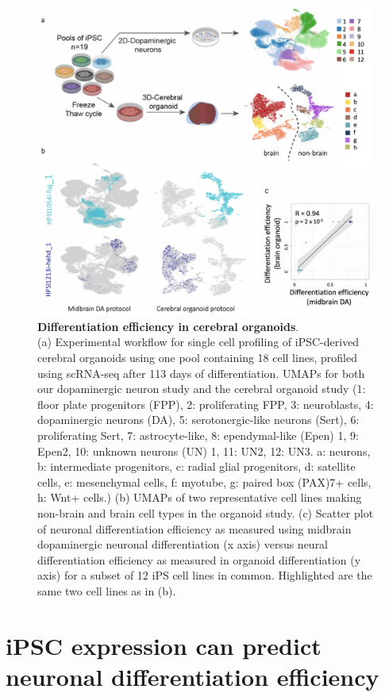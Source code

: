 \begin{figure}[htbp]
\centering
\includegraphics[width=11.5cm]{Chapter5/Fig/neuroseq_organoids.png}
\caption[Differentiation efficiency in cerebral organoids]{\textbf{Differentiation efficiency in cerebral organoids}.\\
(a) Experimental workflow for single cell profiling of iPSC-derived cerebral organoids using one pool containing 18 cell lines, profiled using scRNA-seq after 113 days of differentiation.
UMAPs for both our dopaminergic neuron study and the cerebral organoid study (1: floor plate progenitors (FPP), 2: proliferating FPP, 3: neuroblasts, 4: dopaminergic neurons (DA), 5: serotonergic-like neurons (Sert), 6: proliferating Sert, 7: astrocyte-like, 8: ependymal-like (Epen) 1, 9: Epen2, 10: unknown neurons (UN) 1, 11: UN2, 12: UN3.
a: neurons, b: intermediate progenitors, c: radial glial progenitors, d: satellite cells, e: mesenchymal cells, f: myotube, g: paired box (PAX)7+ cells, h: Wnt+ cells.)
(b) UMAPs of two representative cell lines making non-brain and brain cell types in the organoid study. 
(c) Scatter plot of neuronal differentiation efficiency as measured using midbrain dopaminergic neuronal differentiation (x axis) versus neural differentiation efficiency as measured in organoid differentiation (y axis) for a subset of 12 iPS cell lines in common. 
Highlighted are the same two cell lines as in (b).}
\label{fig:neuroseq_organoids}
\end{figure}

\clearpage

\section{iPSC expression can predict neuronal differentiation efficiency}
\label{sec:neuroseq_ips}

